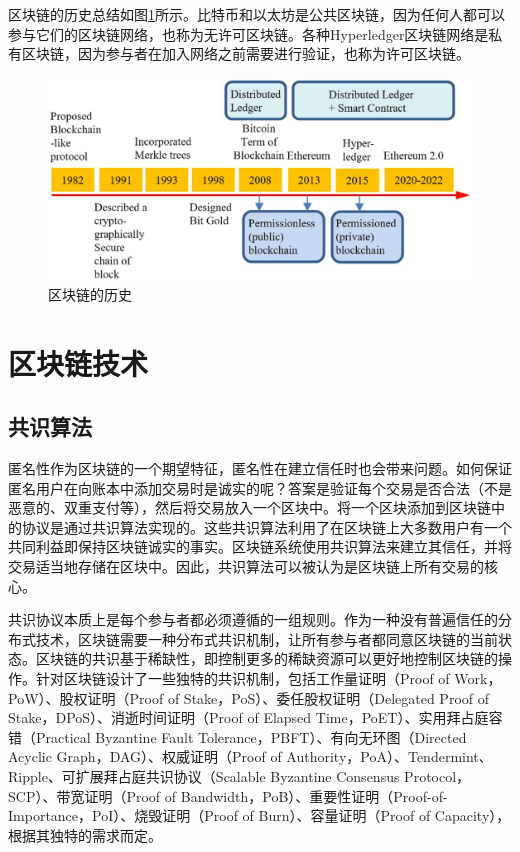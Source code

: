 \begin{translation}
区块链的历史总结如图\ref{fig:区块链的历史}所示。比特币和以太坊是公共区块链，因为任何人都可以参与它们的区块链网络，也称为无许可区块链。各种Hyperledger区块链网络是私有区块链，因为参与者在加入网络之前需要进行验证，也称为许可区块链。

\begin{figure}
	\centering
	\includegraphics[width=\textwidth]{figures/trans1.jpg}
	\caption{区块链的历史}
	\label{fig:区块链的历史}
\end{figure}

\section{区块链技术}
\subsection{共识算法}
匿名性作为区块链的一个期望特征，匿名性在建立信任时也会带来问题。如何保证匿名用户在向账本中添加交易时是诚实的呢？答案是验证每个交易是否合法（不是恶意的、双重支付等），然后将交易放入一个区块中。将一个区块添加到区块链中的协议是通过共识算法实现的。这些共识算法利用了在区块链上大多数用户有一个共同利益即保持区块链诚实的事实。区块链系统使用共识算法来建立其信任，并将交易适当地存储在区块中。因此，共识算法可以被认为是区块链上所有交易的核心。

共识协议本质上是每个参与者都必须遵循的一组规则。作为一种没有普遍信任的分布式技术，区块链需要一种分布式共识机制，让所有参与者都同意区块链的当前状态。区块链的共识基于稀缺性，即控制更多的稀缺资源可以更好地控制区块链的操作。针对区块链设计了一些独特的共识机制，包括工作量证明（Proof of Work，PoW）\cite{art8}、股权证明（Proof of Stake，PoS）\cite{art12}、委任股权证明（Delegated Proof of Stake，DPoS）\cite{art13}、消逝时间证明（Proof of Elapsed Time，PoET）\cite{art14}、实用拜占庭容错（Practical Byzantine Fault Tolerance，PBFT）\cite{art15}、有向无环图（Directed Acyclic Graph，DAG）\cite{art16,art17}、权威证明（Proof of Authority，PoA）\cite{art18}、Tendermint\cite{art19}、Ripple\cite{art20}、可扩展拜占庭共识协议（Scalable Byzantine Consensus Protocol，SCP）\cite{art21}、带宽证明（Proof of Bandwidth，PoB）\cite{art22}、重要性证明（Proof-of-Importance，PoI）\cite{art23}、烧毁证明（Proof of Burn）\cite{art24}、容量证明（Proof of Capacity）\cite{art25}，根据其独特的需求而定。


\end{translation}
